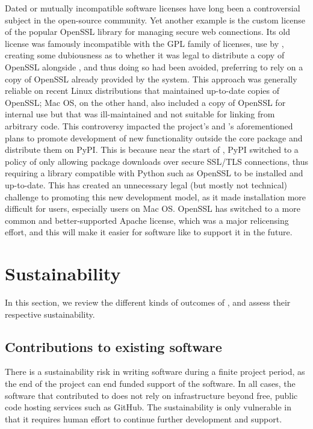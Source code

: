 \documentclass{deliverablereport}
\begin{document}
Dated or mutually incompatible software licenses have long been a
controversial subject in the open-source community. Yet another example
is the custom license of the popular OpenSSL library for managing secure
web connections.  Its old license was famously incompatible with the GPL
family of licenses, use by \Sage, creating some dubiousness as to whether
it was legal to distribute a copy of OpenSSL alongside \Sage, and thus
doing so had been avoided, preferring to rely on a copy of OpenSSL already
provided by the system.  This approach was generally reliable on recent
Linux distributions that maintained up-to-date copies of OpenSSL; Mac OS,
on the other hand, also included a copy of OpenSSL for internal use but that
was ill-maintained and not suitable for linking from arbitrary code.
This controversy impacted the \Sage project's and \ODK's aforementioned plans
to promote development of new functionality outside the core package and
distribute them on PyPI.  This is because near the start of \ODK, PyPI
switched to a policy of only allowing package downloads over secure SSL/TLS
connections, thus requiring a library compatible with Python such as OpenSSL to
be installed and up-to-date.  This has created an unnecessary legal (but
mostly not technical) challenge to promoting this new development model,
as it made installation more difficult for users, especially users on
Mac OS.  OpenSSL has switched to a more common and better-supported Apache
license, which was a major relicensing effort, and this will make it easier
for software like \Sage to support it in the future.



\section{Sustainability}

In this section, we review the different kinds of outcomes of
\ODK, and assess their respective sustainability.

\subsection{Contributions to existing software}

There is a sustainability risk in writing software during a finite project period,
as the end of the project can end funded support of the software.
In all cases, the software that \ODK contributed to does not rely on infrastructure
beyond free, public code hosting services such as GitHub.
The sustainability is only vulnerable
in that it requires human effort to continue further development and support.
\end{document}
